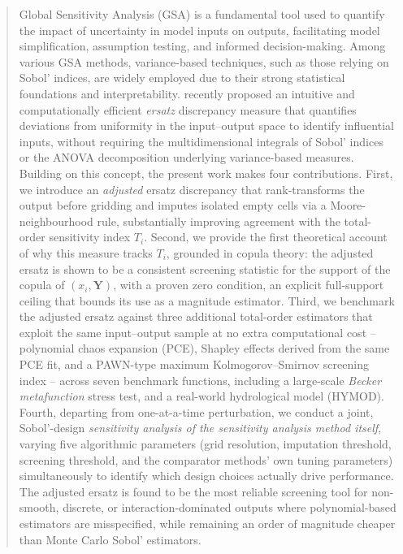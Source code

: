 \documentclass[12pt]{article}
\begin{document}
\bigskip
\begin{abstract}
Global Sensitivity Analysis (GSA) is a fundamental tool used to quantify the impact of uncertainty in model inputs on outputs, facilitating model simplification, assumption testing, and informed decision-making. Among various GSA methods, variance-based techniques, such as those relying on Sobol' indices, are widely employed due to their strong statistical foundations and interpretability. \citet{puy2024discrepancy} recently proposed an intuitive and computationally efficient \textit{ersatz} discrepancy measure that quantifies deviations from uniformity in the input--output space to identify influential inputs, without requiring the multidimensional integrals of Sobol' indices or the ANOVA decomposition underlying variance-based measures. Building on this concept, the present work makes four contributions. First, we introduce an \textit{adjusted} ersatz discrepancy that rank-transforms the output before gridding and imputes isolated empty cells via a Moore-neighbourhood rule, substantially improving agreement with the total-order sensitivity index $T_i$. Second, we provide the first theoretical account of why this measure tracks $T_i$, grounded in copula theory: the adjusted ersatz is shown to be a consistent screening statistic for the support of the copula of $(x_i,\bm Y)$, with a proven zero condition, an explicit full-support ceiling that bounds its use as a magnitude estimator. Third, we benchmark the adjusted ersatz against three additional total-order estimators that exploit the same input--output sample at no extra computational cost -- polynomial chaos expansion (PCE), Shapley effects derived from the same PCE fit, and a PAWN-type maximum Kolmogorov--Smirnov screening index -- across seven benchmark functions, including a large-scale \textit{Becker metafunction} stress test, and a real-world hydrological model (HYMOD). Fourth, departing from one-at-a-time perturbation, we conduct a joint, Sobol'-design \textit{sensitivity analysis of the sensitivity analysis method itself}, varying five algorithmic parameters (grid resolution, imputation threshold, screening threshold, and the comparator methods' own tuning parameters) simultaneously to identify which design choices actually drive performance. The adjusted ersatz is found to be the most reliable screening tool for non-smooth, discrete, or interaction-dominated outputs where polynomial-based estimators are misspecified, while remaining an order of magnitude cheaper than Monte Carlo Sobol' estimators.
\end{abstract}
\end{document}

